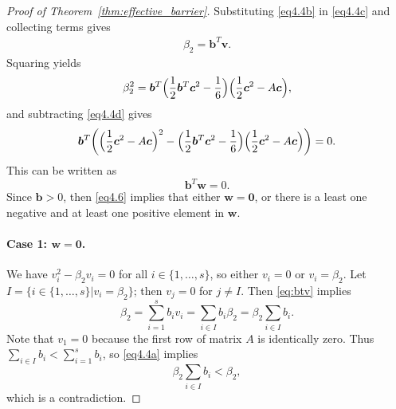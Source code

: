 \begin{proof}[Proof of Theorem~\ref{thm:effective_barrier}]
    Substituting \eqref{eq4.4b} in \eqref{eq4.4c} and collecting terms gives 
    \begin{align} \label{eq:btv}
        \beta_{2} = \bm{b}^{T}\bm{v}.
    \end{align}
    Squaring yields
    \begin{equation*}%
        \beta_{2}^{2} = \bm{b}^{T}\Bigl(\frac{1}{2}\bm{b}^{T}\bm{c}^{2} - \frac{1}{6}\Bigr)\Bigl(\frac{1}{2}\bm{c}^{2} - A\bm{c}\Bigr),
    \end{equation*}
    and subtracting \eqref{eq4.4d} gives
    \begin{equation*}
        \bm{b}^{T}\biggl(\Bigl(\frac{1}{2}\bm{c}^{2} - A\bm{c}\Bigr)^{2} - \Bigl(\frac{1}{2}\bm{b}^{T}\bm{c}^{2} - \frac{1}{6}\Bigr)\Bigl(\frac{1}{2}\bm{c}^{2} - A\bm{c}\Bigr)\biggr) = 0.
    \end{equation*}
    This can be written as
    \begin{equation}\label{eq4.6}
        \bm{b}^{T}\bm{w} = 0.
    \end{equation}
    Since $\bm{b}>0$, then \eqref{eq4.6} implies that either $\bm{w} = \bm{0}$,
    or there is a least one negative and at least one positive element in $\bm{w}$.

\paragraph{Case 1: $\bm{w} = \bm{0}$.}

We have $v_{i}^{2} - \beta_{2}v_{i} = 0$ for all $i \in \{1,\dots,s\}$, so either $v_{i} = 0$ or $v_{i} = \beta_{2}$.
Let $I = \{ i \in\{1,\dots,s\} | v_{i} = \beta_{2} \}$; then $v_{j} = 0$ for $j \neq I$. 
Then \eqref{eq:btv} implies 
$$ \beta_{2} = \sum_{i=1}^{s}b_{i}v_{i} = \sum_{i \in I}b_{i}\beta_{2} = \beta_{2}\sum_{i \in I}b_{i}.$$
Note that $v_{1} = 0$ because the first row of matrix $A$ is identically zero. 
Thus $\sum_{i\in I}b_i < \sum_{i=1}^s b_i$, so \eqref{eq4.4a} implies
$$\beta_{2}\sum_{i \in I}b_{i}< \beta_{2},$$
which is a contradiction.


\end{proof}
